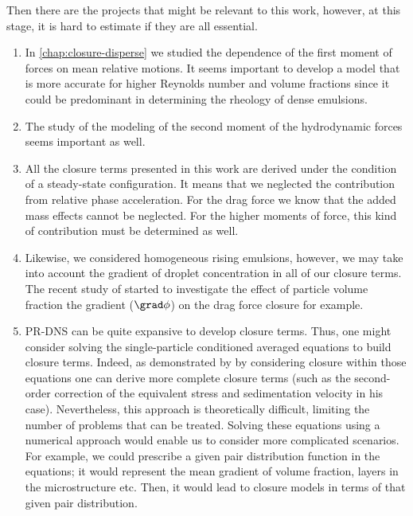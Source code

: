 Then there are the projects that might be relevant to this work, 
however, at this stage, it is hard to estimate if they are all essential.
\begin{enumerate}
    \item In \ref{chap:closure-disperse} we studied the dependence of the first moment of forces on mean relative motions.
    It seems important to develop a model that is more accurate for higher Reynolds number and volume fractions since it could be predominant in determining the rheology of dense emulsions. 
    \item The study of the modeling of the second moment of the hydrodynamic forces seems important as well. 
    \item All the closure terms presented in this work are derived under the condition of a steady-state configuration.
    It means that we neglected the contribution from relative phase acceleration. 
    For the drag force we know that the added mass effects cannot be neglected. 
    For the higher moments of force, this kind of contribution must be determined as well. 
    \item Likewise, we considered homogeneous rising emulsions, however, we may take into account the gradient of droplet concentration in all of our closure terms. 
    The recent study of \citet{wang2024effect} started to investigate the effect of particle volume fraction the gradient  ($\grad\phi$) on the drag force closure for example.  
    \item PR-DNS can be quite expansive to develop closure terms. 
    Thus, one might consider solving the single-particle conditioned averaged equations to build closure terms.  
    Indeed, as demonstrated by \citet{hinch1977averaged} by considering closure within those equations one can derive more complete closure terms (such as the second-order correction of the equivalent stress and sedimentation velocity in his case). 
    Nevertheless, this approach is theoretically difficult, limiting the number of problems that can be treated. 
    Solving these equations using a numerical approach would enable us to consider more complicated scenarios. 
    For example, we could prescribe a given pair distribution function in the equations; it would represent the mean gradient of volume fraction, layers in the microstructure etc. 
    Then, it would lead to closure models in terms of that given pair distribution. 
\end{enumerate}


    